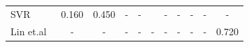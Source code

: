\documentclass{article}
\begin{document}
\begin{table}[]
\begin{tabular}{lcccccccccc}
SVR~\cite{zhang2021speechocean762}                              & 0.160                                                                         & 0.450                                                                        & -                                                                             & -                                                                             &                                                                               & -                                                                             & -                                                                             & -                                                                             & -                                                                             & -                                                                             \\
Lin et.al~\cite{lin2021deep}                                   & -                                                                             & -                                                                            & -                                                                             & -                                                                             & -                                                                             & -                                                                             & -                                                                             & -                                                                             & -                                                                             & 0.720                                                                         \\ \hline

\end{tabular}
\end{table}
\end{document}
